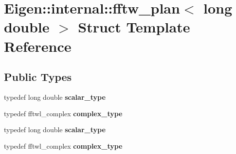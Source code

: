 \hypertarget{struct_eigen_1_1internal_1_1fftw__plan_3_01long_01double_01_4}{}\section{Eigen\+:\+:internal\+:\+:fftw\+\_\+plan$<$ long double $>$ Struct Template Reference}
\label{struct_eigen_1_1internal_1_1fftw__plan_3_01long_01double_01_4}
\subsection*{Public Types}
\begin{DoxyCompactItemize}
\item 
\mbox{\label{struct_eigen_1_1internal_1_1fftw__plan_3_01long_01double_01_4_af8085066b390c525d500c59e0ca6ae1e}} 
typedef long double {\bfseries scalar\+\_\+type}
\item 
\mbox{\label{struct_eigen_1_1internal_1_1fftw__plan_3_01long_01double_01_4_aa3b17911c60e66d3a4fb0b6344d84ed2}} 
typedef fftwl\+\_\+complex {\bfseries complex\+\_\+type}
\item 
\mbox{\label{struct_eigen_1_1internal_1_1fftw__plan_3_01long_01double_01_4_af8085066b390c525d500c59e0ca6ae1e}} 
typedef long double {\bfseries scalar\+\_\+type}
\item 
\mbox{\label{struct_eigen_1_1internal_1_1fftw__plan_3_01long_01double_01_4_aa3b17911c60e66d3a4fb0b6344d84ed2}} 
typedef fftwl\+\_\+complex {\bfseries complex\+\_\+type}
\end{DoxyCompactItemize}
